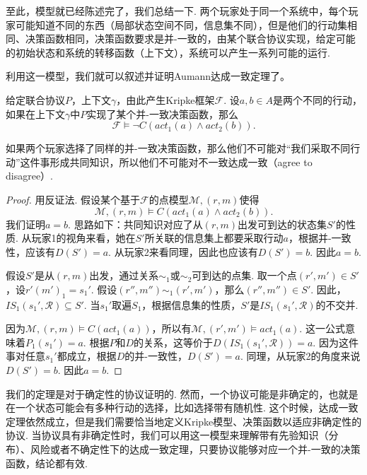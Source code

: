 至此，模型就已经陈述完了，我们总结一下. 两个玩家处于同一个系统中，每个玩家可能知道不同的东西（局部状态空间不同，信息集不同），但是他们的行动集相同、决策函数相同，决策函数要求是并-一致的，由某个联合协议实现，给定可能的初始状态和系统的转移函数（上下文），系统可以产生一系列可能的运行.

利用这一模型，我们就可以叙述并证明Aumann达成一致定理了。

\begin{theorem}[Aumann达成一致定理]
给定联合协议$P$，上下文$\gamma$，由此产生Kripke框架$\mathcal F$. 设$a,b\in A$是两个不同的行动，如果在上下文$\gamma$中$P$实现了某个并-一致决策函数，那么
\[\mathcal F\vDash\neg C(act_1(a)\wedge act_2(b)).\]
\end{theorem}

如果两个玩家选择了同样的并-一致决策函数，那么他们不可能对“我们采取不同行动”这件事形成共同知识，所以他们不可能对不一致达成一致（agree to disagree）.

\begin{proof}
用反证法. 假设某个基于$\mathcal F$的点模型$\mathcal M,(r,m)$使得
    \[\mathcal M,(r,m)\vDash C(act_1(a)\wedge act_2(b)).\]
我们证明$a=b$. 思路如下：共同知识对应了从$(r,m)$出发可到达的状态集$S'$的性质. 从玩家1的视角来看，她在$S'$所关联的信息集上都要采取行动$a$，根据并-一致性，应该有$D(S')=a$. 从玩家2来看同理，因此也应该有$D(S')=b$. 因此$a=b$.

假设$S'$是从$(r,m)$出发，通过关系$\sim_1$或$\sim_2$可到达的点集. 取一个点$(r',m')\in S'$，设$r'(m')_1=s_1'$. 假设$(r'',m'')\sim_1(r',m')$，那么$(r'',m'')\in S'$. 因此，$IS_1(s_1',\mathcal R)\subseteq S'$. 当$s_1'$取遍$S_1$，根据信息集的性质，$S'$是$IS_1(s_1',\mathcal R)$的不交并.

因为$\mathcal M,(r,m)\vDash C(act_1(a))$，所以有$\mathcal M,(r',m')\vDash act_1(a)$. 这一公式意味着$P_1(s_1')=a$. 根据$P$和$D$的关系，这等价于$D(IS_1(s_1',\mathcal R))=a$. 因为这件事对任意$s_1'$都成立，根据$D$的并-一致性，$D(S')=a$. 同理，从玩家2的角度来说$D(S')=b$. 因此$a=b$.
\end{proof}

\begin{remark}
我们的定理是对于确定性的协议证明的. 然而，一个协议可能是非确定的，也就是在一个状态可能会有多种行动的选择，比如选择带有随机性. 这个时候，达成一致定理依然成立，但是我们需要恰当地定义Kripke模型、决策函数以适应非确定性的协议. 当协议具有非确定性时，我们可以用这一模型来理解带有先验知识（分布）、风险或者不确定性下的达成一致定理，只要协议能够对应一个并-一致的决策函数，结论都有效.
\end{remark}


